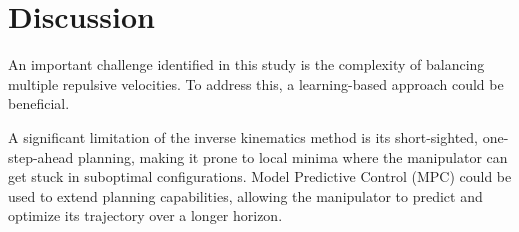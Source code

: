 \documentclass[letterpaper, 10 pt, conference]{ieeeconf}  %
\begin{document}
\section{Discussion}



An important challenge identified in this study is the complexity of balancing multiple repulsive velocities. To address this, a learning-based approach could be beneficial.

%

A significant limitation of the inverse kinematics method is its short-sighted, one-step-ahead planning, making it prone to local minima where the manipulator can get stuck in suboptimal configurations. Model Predictive Control (MPC) could be used to extend planning capabilities, allowing the manipulator to predict and optimize its trajectory over a longer horizon. 

\end{document}
